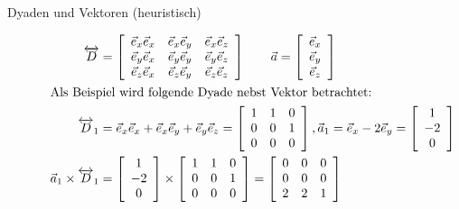 \begin{description}
\item[Dyaden und Vektoren (heuristisch)]
\begin{align*}
\overleftrightarrow{D} &= \left[
\begin{array}{ccc}
\vec{e}_x\vec{e}_x & \vec{e}_x\vec{e}_y & \vec{e}_x\vec{e}_z \\ 
\vec{e}_y\vec{e}_x & \vec{e}_y\vec{e}_y & \vec{e}_y\vec{e}_z \\ 
\vec{e}_z\vec{e}_x & \vec{e}_z\vec{e}_y & \vec{e}_z\vec{e}_z \\ 
\end{array} \right] \qquad
\vec{a} =  \left[
\begin{array}{c}
\vec{e}_x \\ 
\vec{e}_y \\ 
\vec{e}_z \\ 
\end{array} \right]\\
\intertext{Als Beispiel wird folgende Dyade nebst Vektor betrachtet:}
\overleftrightarrow{D}_1 &= 
\vec{e}_x\vec{e}_x + \vec{e}_x\vec{e}_y + \vec{e}_y\vec{e}_z
=
\left[
\begin{array}{ccc}
1 & 1 & 0 \\ 
0 & 0 & 1 \\ 
0 & 0 & 0 \\ 
\end{array} \right],
\vec{a}_1 = 
\vec{e}_x - 2\vec{e}_y
= \left[
\begin{array}{c}
1 \\ 
-2 \\ 
0 \\ 
\end{array}\right]\\
\vec{a}_1 \times \overleftrightarrow{D}_1 &= \left[
\begin{array}{c}
1 \\ 
-2 \\ 
0 \\ 
\end{array}\right] \times \left[
\begin{array}{ccc}
1 & 1 & 0 \\ 
0 & 0 & 1 \\ 
0 & 0 & 0 \\ 
\end{array} \right] =
\left[
\begin{array}{ccc}
0 & 0 & 0 \\ 
0 & 0 & 0 \\ 
2 & 2 & 1 \\ 
\end{array} \right]

\end{align*}
\end{description}
